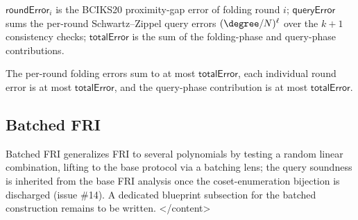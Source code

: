 \begin{definition}\label{def:fri_error}
    $\mathsf{roundError}_i$ is the BCIKS20 proximity-gap error of folding round $i$;
    $\mathsf{queryError}$ sums the per-round Schwartz--Zippel query errors $(\degree/N)^\ell$ over
    the $k+1$ consistency checks; $\mathsf{totalError}$ is the sum of the folding-phase and
    query-phase contributions.
\end{definition}

\begin{lemma}\label{lem:fri_error_projections}
    The per-round folding errors sum to at most $\mathsf{totalError}$, each individual round error
    is at most $\mathsf{totalError}$, and the query-phase contribution is at most
    $\mathsf{totalError}$.
\end{lemma}

\subsection{Batched FRI}\label{sec:batched_fri}

Batched FRI generalizes FRI to several polynomials by testing a random linear combination, lifting
to the base protocol via a batching lens; the query soundness is inherited from the base FRI
analysis once the coset-enumeration bijection is discharged (issue \#14). A dedicated blueprint
subsection for the batched construction remains to be written.
</content>
